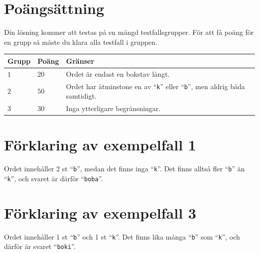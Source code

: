 \section*{Poängsättning}
Din lösning kommer att testas på en mängd testfallsgrupper.
För att få poäng för en grupp så måste du klara alla testfall i gruppen.

\noindent
\begin{tabular}{| l | l | p{12cm} |}
  \hline
  \textbf{Grupp} & \textbf{Poäng} & \textbf{Gränser} \\ \hline
  $1$    & $20$       & Ordet är endast en bokstav långt. \\ \hline
  $2$    & $50$       & Ordet har åtminstone en av ``\texttt{k}'' eller ``\texttt{b}'', men aldrig båda samtidigt. \\ \hline
  $3$    & $30$       & Inga ytterligare begränsningar. \\ \hline
\end{tabular}

\section*{Förklaring av exempelfall 1}
Ordet innehåller 2 st ``\texttt{b}'', medan det finns inga ``\texttt{k}''. Det finns alltså fler ``\texttt{b}'' än ``\texttt{k}'', och svaret är därför ``\texttt{boba}''.

\section*{Förklaring av exempelfall 3}
Ordet innehåller 1 st ``\texttt{b}'' och 1 st ``\texttt{k}''. Det finns lika många ``\texttt{b}'' som ``\texttt{k}'', och därför är svaret ``\texttt{boki}''.

